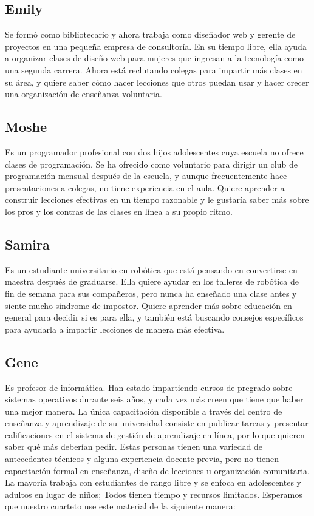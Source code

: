 \documentclass[
]{book}
\begin{document}
\hypertarget{emily}{%
\subsection{Emily}\label{emily}}

Se formó como bibliotecario y ahora trabaja como diseñador web y gerente de proyectos en una pequeña empresa de consultoría. En su tiempo libre, ella ayuda a organizar clases de diseño web para mujeres que ingresan a la tecnología como una segunda carrera. Ahora está reclutando colegas para impartir más clases en su área, y quiere saber cómo hacer lecciones que otros puedan usar y hacer crecer una organización de enseñanza voluntaria.

\hypertarget{moshe}{%
\subsection{Moshe}\label{moshe}}

Es un programador profesional con dos hijos adolescentes cuya escuela no ofrece clases de programación. Se ha ofrecido como voluntario para dirigir un club de programación mensual después de la escuela, y aunque frecuentemente hace presentaciones a colegas, no tiene experiencia en el aula. Quiere aprender a construir lecciones efectivas en un tiempo razonable y le gustaría saber más sobre los pros y los contras de las clases en línea a su propio ritmo.

\hypertarget{samira}{%
\subsection{Samira}\label{samira}}

Es un estudiante universitario en robótica que está pensando en convertirse en maestra después de graduarse. Ella quiere ayudar en los talleres de robótica de fin de semana para sus compañeros, pero nunca ha enseñado una clase antes y siente mucho síndrome de impostor. Quiere aprender más sobre educación en general para decidir si es para ella, y también está buscando consejos específicos para ayudarla a impartir lecciones de manera más efectiva.

\hypertarget{gene}{%
\subsection{Gene}\label{gene}}

Es profesor de informática. Han estado impartiendo cursos de pregrado sobre sistemas operativos durante seis años, y cada vez más creen que tiene que haber una mejor manera. La única capacitación disponible a través del centro de enseñanza y aprendizaje de su universidad consiste en publicar tareas y presentar calificaciones en el sistema de gestión de aprendizaje en línea, por lo que quieren saber qué más deberían pedir.
Estas personas tienen una variedad de antecedentes técnicos y alguna experiencia docente previa, pero no tienen capacitación formal en enseñanza, diseño de lecciones u organización comunitaria. La mayoría trabaja con estudiantes de rango libre y se enfoca en adolescentes y adultos en lugar de niños; Todos tienen tiempo y recursos limitados. Esperamos que nuestro cuarteto use este material de la siguiente manera:
\end{document}
